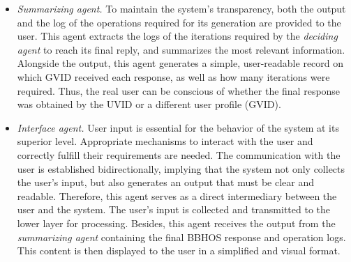 \begin{itemize}
    \item \textit{Summarizing agent.} To maintain the system's transparency, both the output and the log of the operations required for its generation are provided to the user. This agent extracts the logs of the iterations required by the \textit{deciding agent} to reach its final reply, and summarizes the most relevant information. Alongside the output, this agent generates a simple, user-readable record on which GVID received each response, as well as how many iterations were required. Thus, the real user can be conscious of whether the final response was obtained by the UVID or a different user profile (GVID).
    
    \item \textit{Interface agent.} User input is essential for the behavior of the system at its superior level. Appropriate mechanisms to interact with the user and correctly fulfill their requirements are needed. The communication with the user is established bidirectionally, implying that the system not only collects the user's input, but also generates an output that must be clear and readable. Therefore, this agent serves as a direct intermediary between the user and the system. The user's input is collected and transmitted to the lower layer for processing. Besides, this agent receives the output from the \textit{summarizing agent} containing the final BBHOS response and operation logs. This content is then displayed to the user in a simplified and visual format.
\end{itemize}


